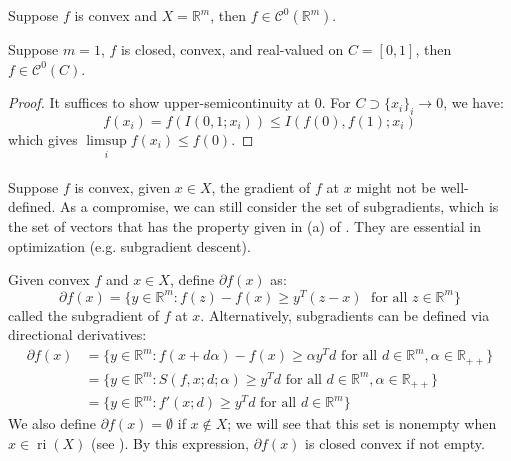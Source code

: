 \begin{coro}
	\label{coro:022-continuity-real-valued}
	Suppose $f$ is convex and $X=\mathbb{R}^m$, then $f\in \mathscr{C}^0(\mathbb{R}^m)$.
\end{coro}

\begin{coro}
	\label{coro:022-line-continuity}
	Suppose $m=1$, $f$ is closed, convex, and real-valued on $C=[0,1]$, then $f\in \mathscr{C}^0(C)$.
\end{coro}

\begin{proof}
	It suffices to show upper-semicontinuity at $0$. For $C\supset \{x_i\}_i\to 0$, we have:
	\[
		f(x_i)=f(I(0,1;x_i))\leq I(f(0),f(1); x_i)
	\]
	which gives $\underset{i}{\operatorname{limsup}}f(x_i)\leq f(0)$.
\end{proof}

\paragraph{}Suppose $f$ is convex, given $x\in X$, the gradient of $f$ at $x$ might not be well-defined. As a compromise, we can still consider the set of subgradients, which is the set of vectors that has the property given in (a) of . They are essential in optimization (e.g. subgradient descent).

\begin{defn}[Subgradients]\label{defn:022-subgradients}
	Given convex $f$ and $x\in X$, define $\partial f(x)$ as:
	\[
		\partial f(x) = \{
		y\in \mathbb{R}^m: f(z) - f(x) \geq y^T(z- x)\;\text{ for all }z\in \mathbb{R}^m
		\}
	\]
	called the subgradient of $f$ at $x$. Alternatively, subgradients can be defined via directional derivatives:
	\begin{align*}
		\partial f(x) & = \{y\in \mathbb{R}^m: f(x+d \alpha )-f(x) \geq \alpha y^Td \text{ for all }d \in \mathbb{R}^m, \alpha\in \mathbb{R}_{++} \} \\
		              & = \{y\in \mathbb{R}^m: S(f,x; d; \alpha) \geq y^Td \text{ for all }d \in \mathbb{R}^m, \alpha\in \mathbb{R}_{++} \}          \\
		              & = \{y\in \mathbb{R}^m: f'(x; d) \geq y^T d \text{ for all }d \in \mathbb{R}^m \}
	\end{align*}
	We also define $\partial f(x)=\emptyset$ if $x\notin X$; we will see that this set is nonempty when $x\in \operatorname{ri}(X)$ (see ). By this expression, $\partial f(x)$ is closed convex if not empty.
\end{defn}

